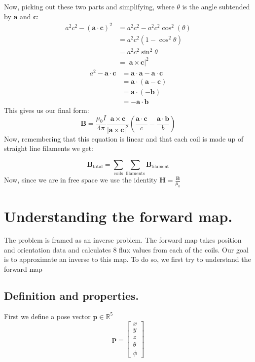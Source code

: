 \documentclass[12pt,a4paper]{report}
\theoremstyle{definition}
\begin{document}
Now, picking out these two parts and simplifying, where $\theta$ is the angle subtended by $\mathbf{a}$ and $\mathbf{c}$:
\begin{align*}
  a^2c^2 - \left( \mathbf{a} \cdot \mathbf{c} \right)^2 &= a^2c^2 - a^2c^2\cos^2(\theta) \\
                               &= a^2c^2(1 - \cos^2\theta) \\
                               &= a^2c^2\sin^2\theta \\
                               &= \left \vert \mathbf{a} \times \mathbf{c} \right \vert ^2
\end{align*}
\begin{align*}
  a^2 - \mathbf{a} \cdot \mathbf{c} &= \mathbf{a} \cdot \mathbf{a} - \mathbf{a} \cdot \mathbf{c} \\
                              &= \mathbf{a} \cdot \left(\mathbf{a} - \mathbf{c}\right) \\
                              &= \mathbf{a} \cdot (-\mathbf{b}) \\
                              &= - \mathbf{a} \cdot \mathbf{b}
\end{align*}
This gives us our final form:
\begin{equation}\label{eq:biot_savart_final}
  \mathbf{B} = \frac{\mu_0 I}{4\pi} \frac{\mathbf{a} \times \mathbf{c}}{\left \vert \mathbf{a} \times \mathbf{c} \right \vert^2 } \left( \frac{\mathbf{a} \cdot \mathbf{c}}{c} - \frac{\mathbf{a} \cdot \mathbf{b}}{b} \right)
\end{equation}
Now, remembering that this equation is linear and that each coil is made up of straight line filaments we get:

\begin{equation}
\mathbf{B}_{\text{total}} = \sum_{\text{coils}} \sum_{\text{filaments}}  \mathbf{B}_{\text{filament}} 
\end{equation}
Now, since we are in free space we use the identity $\mathbf{H} = \frac{\mathbf{B}}{\mu_0}$ \cite[p.~285]{griffiths2013}

\section{Understanding the forward map.}
The problem is framed as an inverse problem. The forward map takes position and orientation data and calculates 8 flux values from each of the coils. Our goal is to approximate an inverse to this map. To do so, we first try to understand the forward map 
\subsection{Definition and properties.}
First we define a pose vector $\mathbf{p} \in \mathbb{R}^5$ \\
\begin{equation}
  \mathbf{p} = 
  \begin{bmatrix}
    x \\ y \\ z \\ \theta \\ \phi 
  \end{bmatrix}
\end{equation}
\end{document}
